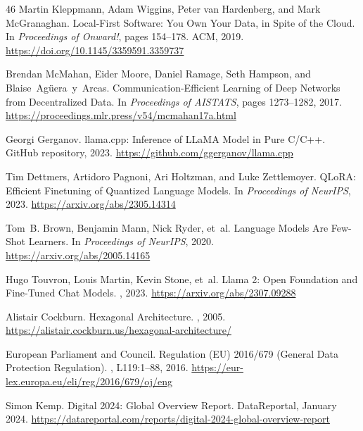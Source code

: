 \documentclass[manuscript,review]{acmart}
\begin{document}
\begin{thebibliography}{46}
Martin Kleppmann, Adam Wiggins, Peter van Hardenberg, and Mark McGranaghan.
\newblock Local-First Software: You Own Your Data, in Spite of the Cloud.
\newblock In {\em Proceedings of Onward!}, pages 154--178. ACM, 2019.
\newblock \url{https://doi.org/10.1145/3359591.3359737}

Brendan McMahan, Eider Moore, Daniel Ramage, Seth Hampson, and Blaise~Ag{\"u}era~y~Arcas.
\newblock Communication-Efficient Learning of Deep Networks from Decentralized Data.
\newblock In {\em Proceedings of AISTATS}, pages 1273--1282, 2017.
\newblock \url{https://proceedings.mlr.press/v54/mcmahan17a.html}

Georgi Gerganov.
\newblock llama.cpp: Inference of LLaMA Model in Pure C/C++.
\newblock GitHub repository, 2023.
\newblock \url{https://github.com/ggerganov/llama.cpp}

Tim Dettmers, Artidoro Pagnoni, Ari Holtzman, and Luke Zettlemoyer.
\newblock QLoRA: Efficient Finetuning of Quantized Language Models.
\newblock In {\em Proceedings of NeurIPS}, 2023.
\newblock \url{https://arxiv.org/abs/2305.14314}

Tom~B. Brown, Benjamin Mann, Nick Ryder, et~al.
\newblock Language Models Are Few-Shot Learners.
\newblock In {\em Proceedings of NeurIPS}, 2020.
\newblock \url{https://arxiv.org/abs/2005.14165}

Hugo Touvron, Louis Martin, Kevin Stone, et~al.
\newblock Llama 2: Open Foundation and Fine-Tuned Chat Models.
, 2023.
\newblock \url{https://arxiv.org/abs/2307.09288}

Alistair Cockburn.
\newblock Hexagonal Architecture.
, 2005.
\newblock \url{https://alistair.cockburn.us/hexagonal-architecture/}

{European Parliament and Council}.
\newblock Regulation (EU) 2016/679 (General Data Protection Regulation).
, L119:1--88, 2016.
\newblock \url{https://eur-lex.europa.eu/eli/reg/2016/679/oj/eng}

Simon Kemp.
\newblock Digital 2024: Global Overview Report.
\newblock DataReportal, January 2024.
\newblock \url{https://datareportal.com/reports/digital-2024-global-overview-report}


\end{thebibliography}
\end{document}
